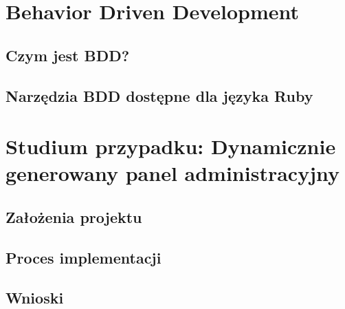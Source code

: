 \chapter[Behavior Driven Development]{Behavior Driven Development}
  \section{Czym jest BDD?}
  \section{Narzędzia BDD dostępne dla języka Ruby}
\chapter[Studium przypadku: Dynamicznie generowany panel administracyjny]{Studium przypadku: Dynamicznie generowany panel administracyjny}
  \section{Założenia projektu}
  \section{Proces implementacji}
  \section{Wnioski}
